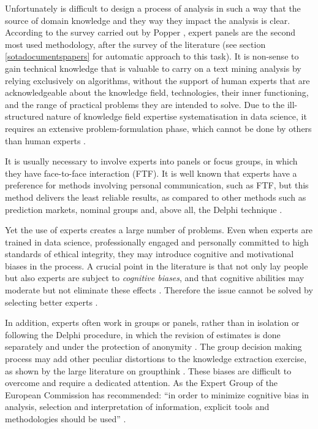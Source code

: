 \documentclass[b5paper,]{book}
\theoremstyle{definition}
\theoremstyle{definition}
\theoremstyle{definition}
\theoremstyle{remark}
\begin{document}
Unfortunately is difficult to design a process of analysis in such a way
that the source of domain knowledge and they way they impact the
analysis is clear. According to the survey carried out by Popper
\citep{popper2008foresight}, expert panels are the second most used
methodology, after the survey of the literature (see section
\ref{sotadocumentspapers} for automatic approach to this task). It is
non-sense to gain technical knowledge that is valuable to carry on a
text mining analysis by relying exclusively on algorithms, without the
support of human experts that are acknowledgeable about the knowledge
field, technologies, their inner functioning, and the range of practical
problems they are intended to solve. Due to the ill-structured nature of
knowledge field expertise systematisation in data science, it requires
an extensive problem-formulation phase, which cannot be done by others
than human experts \citep{bracken2013making}.

It is usually necessary to involve experts into panels or focus groups,
in which they have face-to-face interaction (FTF). It is well known that
experts have a preference for methods involving personal communication,
such as FTF, but this method delivers the least reliable results, as
compared to other methods such as prediction markets, nominal groups
and, above all, the Delphi technique
\citep{woudenberg1991evaluation, graefe2011comparing}.

Yet the use of experts creates a large number of problems. Even when
experts are trained in data science, professionally engaged and
personally committed to high standards of ethical integrity, they may
introduce cognitive and motivational biases in the
process\citep{kahneman2011thinking}. A crucial point in the literature
is that not only lay people but also experts are subject to
\emph{cognitive biases}, and that cognitive abilities may moderate but
not eliminate these effects \citep{stanovich2008relative}. Therefore the
issue cannot be solved by selecting better experts
\citep{taleb2007black}.

In addition, experts often work in groups or panels, rather than in
isolation or following the Delphi procedure, in which the revision of
estimates is done separately and under the protection of anonymity
\citep{meijering2016effect, makkonen2016policy}. The group decision
making process may add other peculiar distortions to the knowledge
extraction exercise, as shown by the large literature on groupthink
\citep{janis1972victims, esser1998alive}. These biases are difficult to
overcome and require a dedicated attention. As the Expert Group of the
European Commission has recommended: ``in order to minimize cognitive
bias in analysis, selection and interpretation of information, explicit
tools and methodologies should be used'' \citep{tuomi2013next}.
\end{document}
